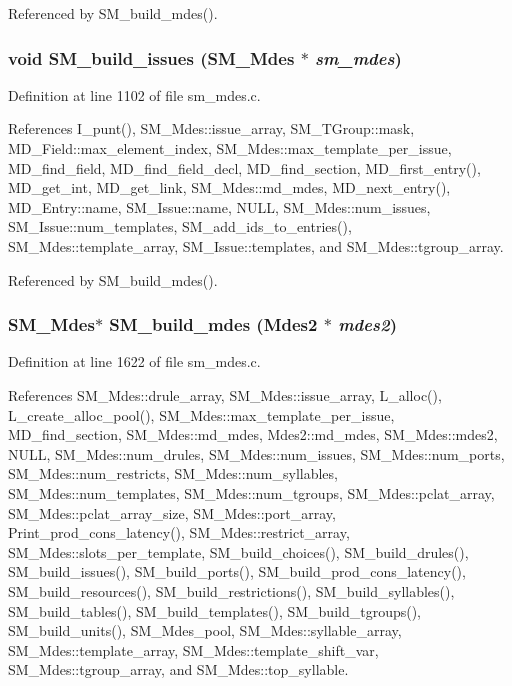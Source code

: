 Referenced by SM\_\-build\_\-mdes().
\subsubsection{\setlength{\rightskip}{0pt plus 5cm}void SM\_\-build\_\-issues (\bf{SM\_\-Mdes} $\ast$ {\em sm\_\-mdes})}\label{sm__mdes_8c_ead8acb2036b72f891df6af0e3f0a1cc}




Definition at line 1102 of file sm\_\-mdes.c.

References I\_\-punt(), SM\_\-Mdes::issue\_\-array, SM\_\-TGroup::mask, MD\_\-Field::max\_\-element\_\-index, SM\_\-Mdes::max\_\-template\_\-per\_\-issue, MD\_\-find\_\-field, MD\_\-find\_\-field\_\-decl, MD\_\-find\_\-section, MD\_\-first\_\-entry(), MD\_\-get\_\-int, MD\_\-get\_\-link, SM\_\-Mdes::md\_\-mdes, MD\_\-next\_\-entry(), MD\_\-Entry::name, SM\_\-Issue::name, NULL, SM\_\-Mdes::num\_\-issues, SM\_\-Issue::num\_\-templates, SM\_\-add\_\-ids\_\-to\_\-entries(), SM\_\-Mdes::template\_\-array, SM\_\-Issue::templates, and SM\_\-Mdes::tgroup\_\-array.

Referenced by SM\_\-build\_\-mdes().
\subsubsection{\setlength{\rightskip}{0pt plus 5cm}\bf{SM\_\-Mdes}$\ast$ SM\_\-build\_\-mdes (\bf{Mdes2} $\ast$ {\em mdes2})}\label{sm__mdes_8c_960a9eb61c8904bfa51841f86ab97fb8}




Definition at line 1622 of file sm\_\-mdes.c.

References SM\_\-Mdes::drule\_\-array, SM\_\-Mdes::issue\_\-array, L\_\-alloc(), L\_\-create\_\-alloc\_\-pool(), SM\_\-Mdes::max\_\-template\_\-per\_\-issue, MD\_\-find\_\-section, SM\_\-Mdes::md\_\-mdes, Mdes2::md\_\-mdes, SM\_\-Mdes::mdes2, NULL, SM\_\-Mdes::num\_\-drules, SM\_\-Mdes::num\_\-issues, SM\_\-Mdes::num\_\-ports, SM\_\-Mdes::num\_\-restricts, SM\_\-Mdes::num\_\-syllables, SM\_\-Mdes::num\_\-templates, SM\_\-Mdes::num\_\-tgroups, SM\_\-Mdes::pclat\_\-array, SM\_\-Mdes::pclat\_\-array\_\-size, SM\_\-Mdes::port\_\-array, Print\_\-prod\_\-cons\_\-latency(), SM\_\-Mdes::restrict\_\-array, SM\_\-Mdes::slots\_\-per\_\-template, SM\_\-build\_\-choices(), SM\_\-build\_\-drules(), SM\_\-build\_\-issues(), SM\_\-build\_\-ports(), SM\_\-build\_\-prod\_\-cons\_\-latency(), SM\_\-build\_\-resources(), SM\_\-build\_\-restrictions(), SM\_\-build\_\-syllables(), SM\_\-build\_\-tables(), SM\_\-build\_\-templates(), SM\_\-build\_\-tgroups(), SM\_\-build\_\-units(), SM\_\-Mdes\_\-pool, SM\_\-Mdes::syllable\_\-array, SM\_\-Mdes::template\_\-array, SM\_\-Mdes::template\_\-shift\_\-var, SM\_\-Mdes::tgroup\_\-array, and SM\_\-Mdes::top\_\-syllable.

